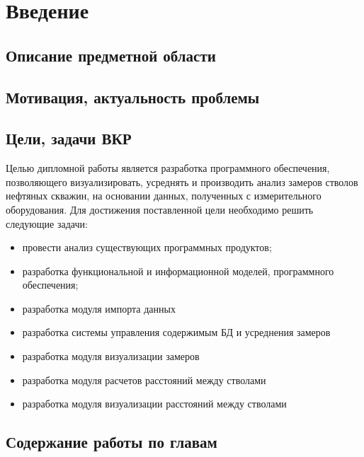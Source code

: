 \newpage
\section*{Введение}
\subsection*{Описание предметной области}

\subsection*{Мотивация, актуальность проблемы}

\subsection*{Цели, задачи ВКР}
Целью дипломной работы является разработка программного обеспечения, позволяющего визуализировать, усреднять и производить анализ замеров стволов нефтяных скважин,
на основании данных, полученных с измерительного оборудования. Для достижения поставленной цели необходимо решить следующие задачи:
\begin{itemize}
  \item провести анализ существующих программных продуктов;
  \item разработка функциональной и информационной моделей, программного обеспечения;
  \item разработка модуля импорта данных
  \item разработка системы управления содержимым БД и усреднения замеров
  \item разработка модуля визуализации замеров
  \item разработка модуля расчетов расстояний между стволами
  \item разработка модуля визуализации расстояний между стволами
\end{itemize}

\subsection*{Содержание работы по главам}

